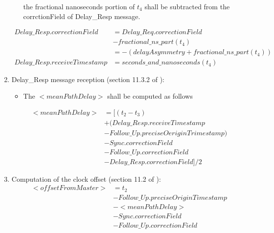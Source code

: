 \documentclass[a4paper, 12pt]{article}
\begin{document}
\begin{enumerate}
\begin{itemize}
	    the fractional nanoseconds portion of $t_4$ shall be subtracted from the 
	    corrctionField of Delay\_Resp message.
    \end{itemize}
	  \begin{align}
	    \label{eq:delay_resp_tx}
	    Delay\_Resp.correctionField 	&= Delay\_Req.correctionField \\
					  &- fractional\_ns\_part(t_4)\\
	  \nonumber	 		&= -(delayAsymmetry + fractional\_ns\_part(t_4)) \\
	    Delay\_Resp.receiveTimestamp 	&= seconds\_and\_nanoseconds(t_4)
	  \end{align}
  \item Delay\_Resp message reception (section 11.3.2 of \cite{IEEE1588}):
    \begin{itemize}
      \item The $<meanPathDelay>$ shall be computed as follows
    \end{itemize}
	  \begin{align}
	    \label{eq:meanPathDelay}
	    <meanPathDelay> &=[(t_2 - t_3) \\
	  \nonumber	  &+ (Delay\_Resp.receiveTimestamp \\
	  \nonumber	  &- Follow\_Up.preciseOeriginTrimestamp)\\ 
	  \nonumber	  &- Sync.correctionField \\
	  \nonumber	  &- Follow\_Up.correctionField \\
	  \nonumber	  &- Delay\_Resp.correctionField]/2
	  \end{align}
  \item Computation of the clock offset  (section 11.2 of \cite{IEEE1588}):
	  \begin{align}
	    \label{eq:offset}
	    <offsetFromMaster> &=t_2 \\
	  \nonumber	  &- Follow\_Up.preciseOriginTimestamp \\
	  \nonumber	  &- <meanPathDelay> \\
	  \nonumber	  &- Sync.correctionField \\
	  \nonumber	  &- Follow\_Up.correctionField 
	  \end{align}
\end{enumerate}
\end{document}
